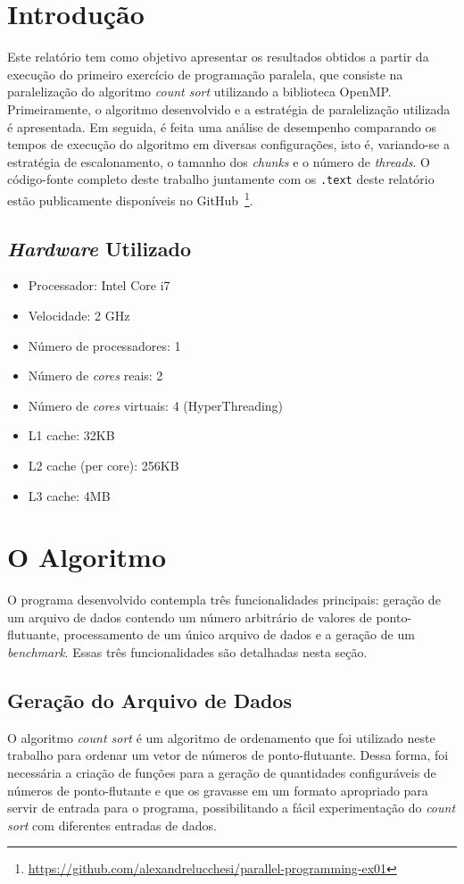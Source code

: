 \documentclass[12pt,a4paper]{article}
\begin{document}


\section{Introdução}
Este relatório tem como objetivo apresentar os resultados obtidos a partir da
execução do primeiro exercício de programação paralela, que consiste na
paralelização do algoritmo \emph{count sort} utilizando a biblioteca OpenMP\@.
Primeiramente, o algoritmo desenvolvido e a estratégia de paralelização
utilizada é apresentada. Em seguida, é feita uma análise de desempenho
comparando os tempos de execução do algoritmo em diversas configurações, isto é,
variando-se a estratégia de escalonamento, o tamanho dos \textit{chunks} e o
número de \textit{threads}. O código-fonte completo deste trabalho juntamente
com os \texttt{.text} deste relatório estão publicamente disponíveis no
GitHub~\footnote{\url{https://github.com/alexandrelucchesi/parallel-programming-ex01}}.

\subsection{\textit{Hardware} Utilizado}

\begin{itemize}
    \item Processador: Intel Core i7
    \item Velocidade: 2 GHz
    \item Número de processadores: 1
    \item Número de \textit{cores} reais: 2
    \item Número de \textit{cores} virtuais: 4 (HyperThreading)
    \item L1 cache: 32KB
    \item L2 cache (per core): 256KB
    \item L3 cache: 4MB
\end{itemize}


\section{O Algoritmo}
O programa desenvolvido contempla três funcionalidades principais: geração de um
arquivo de dados contendo um número arbitrário de valores de ponto-flutuante,
processamento de um único arquivo de dados e a geração de um \textit{benchmark}.
Essas três funcionalidades são detalhadas nesta seção.

\subsection{Geração do Arquivo de Dados}
\label{sec:data-gen}
O algoritmo \textit{count sort} é um algoritmo de ordenamento que foi utilizado
neste trabalho para ordenar um vetor de números de ponto-flutuante. Dessa forma,
foi necessária a criação de funções para a geração de quantidades configuráveis
de números de ponto-flutante e que os gravasse em um formato apropriado para
servir de entrada para o programa, possibilitando a fácil experimentação do
\textit{count sort} com diferentes entradas de dados.
\end{document}

